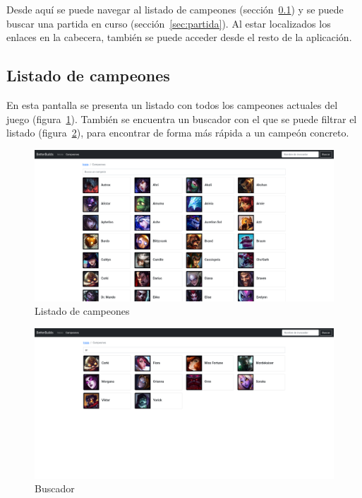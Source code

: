 Desde aquí se puede navegar al listado de campeones (sección~\ref{sec:listado}) y se puede buscar una partida en curso (sección~\ref{sec:partida}). Al estar localizados los enlaces en la cabecera, también se puede acceder desde el resto de la aplicación.

\subsection{Listado de campeones}\label{sec:listado}
En esta pantalla se presenta un listado con todos los campeones actuales del juego (figura~\ref{fig:listado}). También se encuentra un buscador con el que se puede filtrar el listado (figura~\ref{fig:buscador}), para encontrar de forma más rápida a un campeón concreto.

\begin{figure}[h]
	\centering
	\includegraphics[width=1\linewidth]{img/1.listado}
	\caption{Listado de campeones}
	\label{fig:listado}
\end{figure}
\begin{figure}[h]
	\centering
	\includegraphics[width=1\linewidth]{img/2.buscador}
	\caption{Buscador}
	\label{fig:buscador}
\end{figure}

